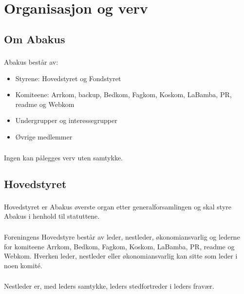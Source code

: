 \section{Organisasjon og verv}
\subsection{Om Abakus}

\subsubsection{}
Abakus består av:

\begin{itemize}
\item Styrene: Hovedstyret og Fondstyret
\item Komiteene: Arrkom, backup, Bedkom, Fagkom, Koskom, LaBamba, PR, readme og Webkom
\item Undergrupper og interessegrupper
\item Øvrige medlemmer
\end{itemize}

\subsubsection{}
Ingen kan pålegges verv uten samtykke.

\subsection{Hovedstyret}

\subsubsection{}
Hovedstyret er Abakus øverste organ etter generalforsamlingen og skal styre
Abakus i henhold til statuttene.

\subsubsection{}
Foreningens Hovedstyre består av leder, nestleder, økonomiansvarlig og
lederne for komiteene Arrkom, Bedkom, Fagkom, Koskom, LaBamba, PR, readme og Webkom.
Hverken leder, nestleder eller økonomiansvarlig kan sitte som leder i noen komité.

\subsubsection{}
Nestleder er, med leders samtykke, leders stedfortreder i leders fravær.

